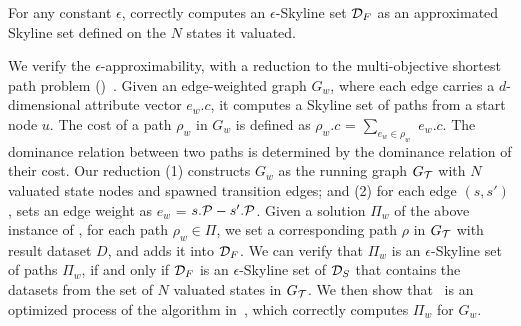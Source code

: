 \begin{lemma}
\label{lm-approximability}
For any constant $\epsilon$, \apxmodis correctly computes an $\epsilon$-Skyline set $\D_F$ as an approximated Skyline set 
defined on the $N$ states it valuated. 
\end{lemma}

\begin{proofS}
We verify the $\epsilon$-approximability, 
with a reduction to the multi-objective 
shortest path problem (\mos)~\cite{tsaggouris2009multiobjective}. 
Given an edge-weighted graph $G_w$, 
where each edge carries a $d$-dimensional 
attribute vector $e_w.c$, it computes a Skyline set of 
paths from a start node $u$. 
The cost of a path $\rho_w$ in $G_w$ is 
defined as $\rho_w.c$ = $\sum_{e_w\in\rho_w}$ $e_w.c$. 
The dominance relation between two paths 
is determined by 
the dominance relation of their cost. 
Our reduction (1) constructs $G_w$ 
as the running graph $G_\T$ with 
$N$ valuated state nodes and 
spawned transition edges; and 
(2) for each edge $(s, s')$, 
sets an edge weight as 
$e_w$ = $s.\P - s'.\P$. 
Given a solution $\Pi_w$ 
of the above instance of \mos, 
for each path $\rho_w\in\Pi$, 
we set a corresponding path $\rho$ 
in $G_\T$ with result dataset $D$, 
and adds it into $\D_F$. 
We can verify that 
$\Pi_w$ is an $\epsilon$-Skyline set 
of paths $\Pi_w$, if and only 
if $\D_F$ is an $\epsilon$-Skyline set 
of $\D_S$ that contains the
datasets from the set of $N$ valuated 
states in $G_\T$. 
We then show that~\apxmodis 
is an optimized process of 
the algorithm in~\cite{tsaggouris2009multiobjective}, 
which correctly computes 
$\Pi_w$ for $G_w$. 
\end{proofS} 




